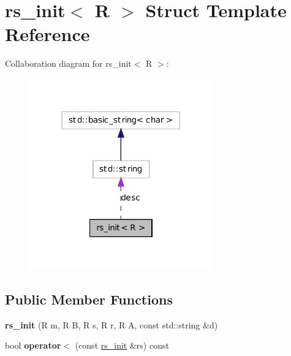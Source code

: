 \hypertarget{structrs__init}{
\section{rs\_\-init$<$ R $>$ Struct Template Reference}
\label{structrs__init}
}


Collaboration diagram for rs\_\-init$<$ R $>$:
\nopagebreak
\begin{figure}[H]
\begin{center}
\leavevmode
\includegraphics[width=224pt]{structrs__init__coll__graph}
\end{center}
\end{figure}
\subsection*{Public Member Functions}
\begin{DoxyCompactItemize}
\item 
\hypertarget{structrs__init_a93198ddfe0f8ffcfe2ee57df20cd78c5}{
{\bfseries rs\_\-init} (R m, R B, R s, R r, R A, const std::string \&d)}
\label{structrs__init_a93198ddfe0f8ffcfe2ee57df20cd78c5}

\item 
\hypertarget{structrs__init_aaca9f6a2e74df7095086c719d84756b3}{
bool {\bfseries operator$<$} (const \hyperlink{structrs__init}{rs\_\-init} \&rs) const }
\label{structrs__init_aaca9f6a2e74df7095086c719d84756b3}

\end{DoxyCompactItemize}
